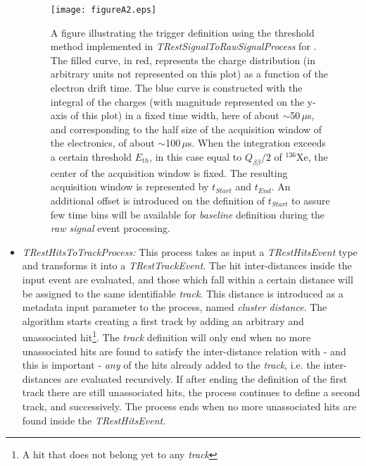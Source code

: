 \begin{itemize}
\begin{figure}[]
\centering
\texttt{[image: figureA2.eps]}
\caption{A figure illustrating the trigger definition using the threshold method implemented in \emph{TRestSignalToRawSignalProcess} for \XeNLDBDEvt. The filled curve, in red, represents the charge distribution (in arbitrary units not represented on this plot) as a function of the electron drift time. The blue curve is constructed with the integral of the charges (with magnitude represented on the y-axis of this plot) in a fixed time width, here of about $\sim$50\,$\mu$s, and corresponding to the half size of the acquisition window of the electronics, of about $\sim$100\,$\mu$s. When the integration exceeds a certain threshold $E_{th}$, in this case equal to $Q_{\beta\beta}/2$ of $^{136}$Xe, the center of the acquisition window is fixed. The resulting acquisition window is represented by $t_{Start}$ and $t_{End}$. An additional offset is introduced on the definition of $t_{Start}$ to assure few time bins will be available for \emph{baseline} definition during the \emph{raw signal} event processing. } 
\label{fig:triggerDefinition}
\end{figure}


\item \emph{TRestHitsToTrackProcess:} This process takes as input a \emph{TRestHitsEvent} type and transforms it into a \emph{TRestTrackEvent}. The hit inter-distances inside the input event are evaluated, and those which fall within a certain distance will be assigned to the same identifiable \emph{track}. This distance is introduced as a metadata input parameter to the process, named \emph{cluster distance}. The algorithm starts creating a first track by adding an arbitrary and unassociated hit\footnote{A hit that does not belong yet to any \emph{track}}. The \emph{track} definition will only end when no more unassociated hits are found to satisfy the inter-distance relation with - and this is important - \emph{any} of the hits already added to the \emph{track}, i.e. the inter-distances are evaluated recursively. If after ending the definition of the first track there are still unassociated hits, the process continues to define a second track, and successively. The process ends when no more unassociated hits are found inside the \emph{TRestHitsEvent}.

\end{itemize}

